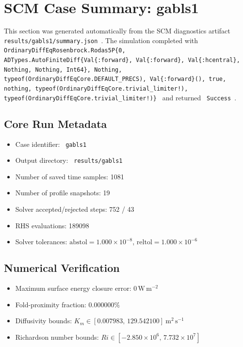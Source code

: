 \section{SCM Case Summary: gabls1}
\label{sec:scm_case_gabls1}

This section was generated automatically from the SCM diagnostics artifact
\texttt{ results/gabls1/summary.json }. The simulation completed with \texttt{ OrdinaryDiffEqRosenbrock.Rodas5P\{0, ADTypes.AutoFiniteDiff\{Val\{:forward\}, Val\{:forward\}, Val\{:hcentral\}, Nothing, Nothing, Int64\}, Nothing, typeof(OrdinaryDiffEqCore.DEFAULT\_PRECS), Val\{:forward\}(), true, nothing, typeof(OrdinaryDiffEqCore.trivial\_limiter!), typeof(OrdinaryDiffEqCore.trivial\_limiter!)\} }
and returned \texttt{ Success }.

\subsection{Core Run Metadata}
\begin{itemize}
  \item Case identifier: \texttt{ gabls1 }
  \item Output directory: \texttt{ results/gabls1 }
  \item Number of saved time samples: 1081
  \item Number of profile snapshots: 19
  \item Solver accepted/rejected steps: 752 / 43
  \item RHS evaluations: 189098
  \item Solver tolerances: $\mathrm{abstol}=1.000 \times 10^{-8}$, $\mathrm{reltol}=1.000 \times 10^{-6}$
\end{itemize}

\subsection{Numerical Verification}
\begin{itemize}
  \item Maximum surface energy closure error:
  $0\,\mathrm{W\,m^{-2}}$
  \item Fold-proximity fraction:
  $0.000000\%$
  \item Diffusivity bounds:
  $K_m \in [0.007983,\,129.542100]~\mathrm{m^2\,s^{-1}}$
  \item Richardson number bounds:
  $Ri \in [-2.850 \times 10^{6},\,7.732 \times 10^{7}]$
\end{itemize}

